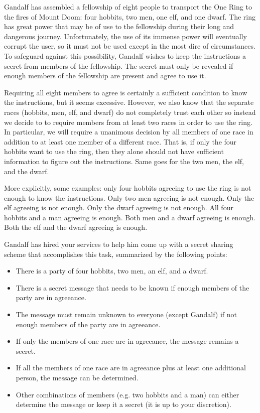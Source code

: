 \documentclass[]{article}
\begin{document}
\begin{qunlist}
Gandalf has assembled a fellowship of eight people to transport the One Ring to the fires of Mount Doom: four hobbits, two men, one elf, and one dwarf. The ring has great power that may be of use to the fellowship during their long and dangerous journey. Unfortunately, the use of its immense power will eventually corrupt the user, so it must not be used except in the most dire of circumstances. To safeguard against this possibility, Gandalf wishes to keep the instructions a secret from members of the fellowship. The secret must only be revealed if enough members of the fellowship are present and agree to use it.

Requiring all eight members to agree is certainly a sufficient condition to know the instructions, but it seems excessive. However, we also know that the separate races (hobbits, men, elf, and dwarf) do not completely trust each other so instead we decide to to require members from at least two races in order to use the ring. In particular, we will require a unanimous decision by all members of one race in addition to at least one member of a different race. That is, if only the four hobbits want to use the ring, then they alone should not have sufficient information to figure out the instructions. Same goes for the two men, the elf, and the dwarf.

More explicitly, some examples: only four hobbits agreeing to use the ring is not enough to know the instructions. Only two men agreeing is not enough. Only the elf agreeing is not enough. Only the dwarf agreeing is not enough. All four hobbits and a man agreeing is enough. Both men and a dwarf agreeing is enough. Both the elf and the dwarf agreeing is enough.

Gandalf has hired your services to help him come up with a secret sharing scheme that accomplishes this task, summarized by the following points:
\begin{itemize}
\item There is a party of four hobbits, two men, an elf, and a dwarf.
\item There is a secret message that needs to be known if enough members of the party are in agreeance.
\item The message must remain unknown to everyone (except Gandalf) if not enough members of the party are in agreeance.
\item If only the members of one race are in agreeance, the message remains a secret.
\item If all the members of one race are in agreeance plus at least one additional person, the message can be determined.
\item Other combinations of members (e.g. two hobbits and a man) can either determine the message or keep it a secret (it is up to your discretion).
\end{itemize}


\end{qunlist}
\end{document}
